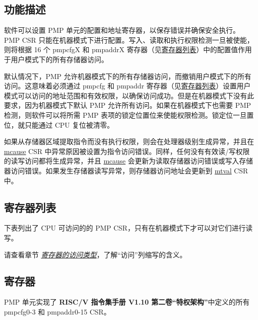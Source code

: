 \documentclass[main\_\_CN.tex]{subfiles}
\begin{document}
\subsection{功能描述}
\label{sec:riscvcpu-pmp-func-descr}

软件可以设置 PMP 单元的配置和地址寄存器，以保存错误并确保安全执行。PMP CSR 只能在机器模式下进行配置。写入、读取和执行权限检测一旦被使能，则将根据 16 个 pmpcfgX 和 pmpaddrX 寄存器（见\hyperref[sec:riscvcpu-pmp-reg-summ]{寄存器列表}）中的配置值作用于用户模式下的所有存储器访问。

默认情况下，PMP 允许机器模式下的所有存储器访问，而撤销用户模式下的所有访问。这意味着必须通过 pmpcfg 和 pmpaddr 寄存器（见\hyperref[sec:riscvcpu-pmp-reg-summ]{寄存器列表}）设置用户模式可以访问的地址范围和有效权限，以确保访问成功。但是在机器模式下没有此要求，因为机器模式下默认 PMP 允许所有访问。如果在机器模式下也需要 PMP 检测，则软件可以将所需 PMP 表项的锁定位置位来使能权限检测。锁定位一旦置位，就只能通过 CPU 复位被清零。

如果从存储器区域提取指令而没有执行权限，则会在处理器级别生成异常，并且在 \hyperref[regdesc:MCAUSE]{mcause} CSR 中异常原因被设置为指令访问错误。同样，任何没有有效读/写权限的读写访问都将生成异常，并且 \hyperref[regdesc:MCAUSE]{mcause} 会更新为读取存储器访问错误或写入存储器访问错误。如果发生存储器读写异常，则存储器访问地址会更新到 \hyperref[regdesc:MTVAL]{mtval} CSR 中。


\hypertarget{riscvcpu-pmp-reg-summ}{}
\subsection{寄存器列表}
\label{sec:riscvcpu-pmp-reg-summ}


下表列出了 CPU 可访问的的 PMP CSR，只有在机器模式下才可以对它们进行读写。

请查看章节 \hyperref[glossary-access-types]{\textit{寄存器的访问类型}}，了解“访问”列缩写的含义。




\subsection{寄存器}
\label{sec:riscvcpu-pmp-reg-desc}

PMP 单元实现了 \textbf{RISC\-/V 指令集手册 V1.10 第二卷“特权架构”}中定义的所有 pmpcfg0-3 和 pmpaddr0-15 CSR。
\end{document}
